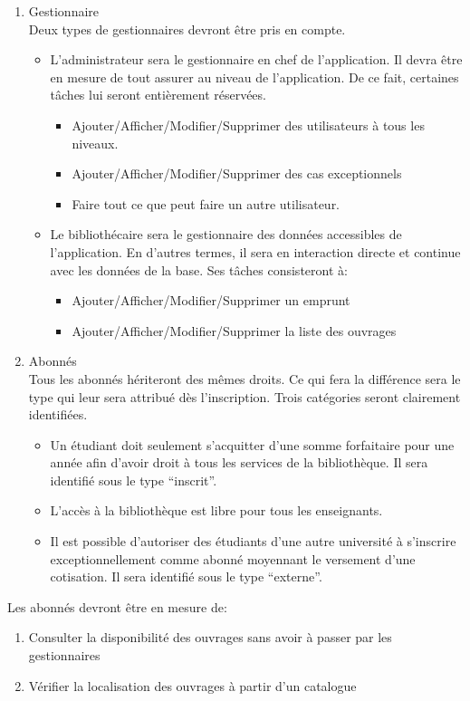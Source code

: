 \begin{enumerate}
    \item Gestionnaire
\\ Deux types de gestionnaires devront être pris en compte.
    \begin{itemize}
        \item L'administrateur sera le gestionnaire en chef
    de l'application. Il devra être en mesure de tout assurer
    au niveau de l'application. De ce fait, certaines tâches
    lui seront entièrement réservées.
        \begin{itemize}
            \item Ajouter/Afficher/Modifier/Supprimer des 
            utilisateurs à tous les niveaux.
            \item Ajouter/Afficher/Modifier/Supprimer des 
            cas exceptionnels
            \item Faire tout ce que peut faire un autre utilisateur.
        \end{itemize}
        \item Le bibliothécaire sera le gestionnaire des 
    données accessibles de l’application. En d’autres termes, 
    il sera en interaction directe et continue avec les données 
    de la base. Ses tâches consisteront à:
        \begin{itemize}
            \item Ajouter/Afficher/Modifier/Supprimer un emprunt
            \item Ajouter/Afficher/Modifier/Supprimer la liste des ouvrages
        \end{itemize}
    \end{itemize}

    \item Abonnés
\\ Tous les abonnés hériteront des mêmes droits. Ce qui fera la 
différence sera le type qui leur sera attribué dès 
l’inscription. Trois catégories seront clairement 
identifiées.
    \begin{itemize}
    \item Un étudiant doit seulement s’acquitter d’une somme 
    forfaitaire pour une année afin d’avoir droit à tous les 
    services de la bibliothèque. Il sera identifié sous le type “inscrit”.
    \item L’accès à la bibliothèque est libre pour tous les enseignants.
    \item Il est possible d’autoriser des étudiants d’une autre université à 
    s’inscrire exceptionnellement comme abonné moyennant le versement d’une 
    cotisation. Il sera identifié sous le type “externe”.
    \end{itemize}
\end{enumerate}
\par 
    Les abonnés devront être en mesure de: \par 
\begin{enumerate}
    \item Consulter la disponibilité des ouvrages sans avoir à
     passer par les gestionnaires
    \item Vérifier la localisation des ouvrages à partir d’un catalogue
\end{enumerate}
    
